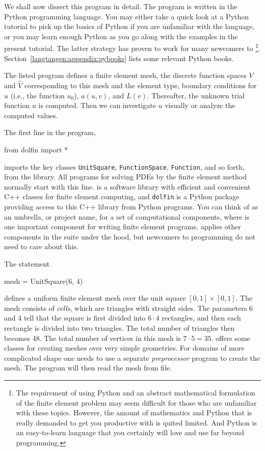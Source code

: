 We shall now dissect this \fenics{} program in detail. The program 
is written in the Python programming language. 
You may either take a quick look at a Python tutorial \cite{PythonTutorial}
to pick up the basics of Python if you are unfamiliar with the language,
or you may learn enough Python as you go along with the examples in the
present tutorial. The latter strategy has proven to work for many newcomers
to \fenics\footnote{The requirement of using Python and an abstract
mathematical formulation of the finite element problem may seem
difficult for those who are unfamiliar with these topics.
However, the amount of mathematics and Python that is really demanded
to get you productive with \fenics{} is quited limited.
And Python is an easy-to-learn language that you certainly will love
and use far beyond \fenics{} programming.}.
Section~\ref{langtangen:appendix:pybooks} lists some relevant Python books.

The listed \fenics{} program defines a finite element mesh, the discrete
function spaces $V$ and $\hat{V}$ corresponding to this mesh and
the element type, boundary conditions
for $u$ (i.e., the function $u_0$), $a(u,v)$, and $L(v)$.
Thereafter, the unknown
trial function $u$ is computed. Then we can investigate $u$ visually or
analyze the computed values.

The first line in the program,
\begin{python}
from dolfin import *
\end{python}
imports the key classes {\fontsize{10pt}{10pt}\verb!UnitSquare!},
{\fontsize{10pt}{10pt}\verb!FunctionSpace!}, {\fontsize{10pt}{10pt}\verb!Function!}, and so forth, from the \dolfin{} library.
All \fenics{} programs for solving PDEs by the finite element method
normally start with this line. \dolfin{} is a software library with efficient 
and convenient C++ classes for finite element computing, and
{\fontsize{10pt}{10pt}\texttt{dolfin}} is a Python package providing access to this
C++ library from Python programs. 
You can think of \fenics{} as an umbrella, or project name, for a set of
computational components, where \dolfin{} is one important component for
writing finite element programs. \dolfin{} applies other components
in the \fenics{} suite under the hood, but newcomers to \fenics{}
programming do not need to care about this.

The statement
\begin{python}
mesh = UnitSquare(6, 4)
\end{python}
defines a uniform finite element mesh over the unit square
$[0,1]\times [0,1]$. The mesh consists of \emph{cells}, 
which are triangles with
straight sides. The parameters 6 and 4 tell that the square is
first divided into $6\cdot 4$ rectangles, and then each rectangle
is divided into two triangles. The total number of triangles
then becomes 48. The total number of vertices in this mesh is
$7\cdot 5=35$.
\dolfin{} offers some classes for creating meshes over
very simple geometries. For domains of more complicated shape one needs
to use a separate \emph{preprocessor} program to create the mesh. 
The \fenics{} program will then read the mesh from file.

